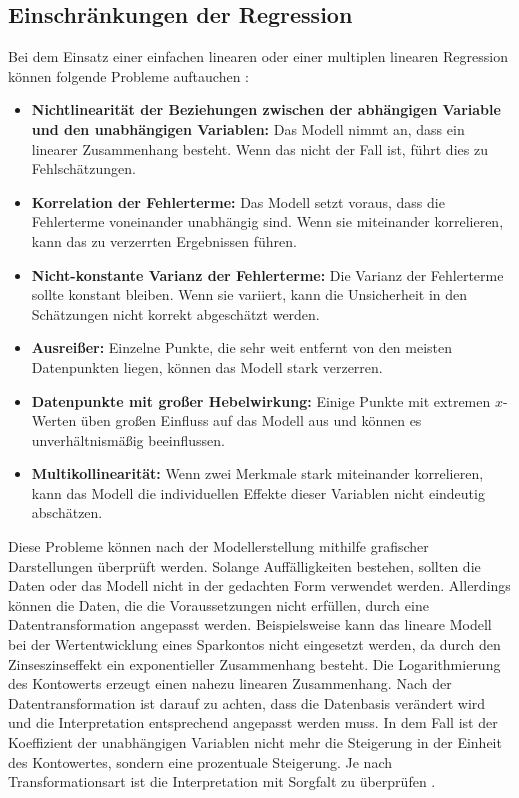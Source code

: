 \subsection{Einschränkungen der Regression}
\label{einschränkungenderregression}
Bei dem Einsatz einer einfachen linearen oder einer multiplen linearen Regression können folgende Probleme auftauchen \cite{james2013introduction}: 
\begin{itemize}
    \item \textbf{Nichtlinearität der Beziehungen zwischen der abhängigen Variable und den unabhängigen Variablen:} Das Modell nimmt an, dass ein linearer Zusammenhang besteht. Wenn das nicht der Fall ist, führt dies zu Fehlschätzungen. 
    \item \textbf{Korrelation der Fehlerterme:} Das Modell setzt voraus, dass die Fehlerterme voneinander unabhängig sind. Wenn sie miteinander korrelieren, kann das zu verzerrten Ergebnissen führen.
    \item \textbf{Nicht-konstante Varianz der Fehlerterme:} Die Varianz der Fehlerterme sollte konstant bleiben. Wenn sie variiert, kann die Unsicherheit in den Schätzungen nicht korrekt abgeschätzt werden.
    \item \textbf{Ausreißer:} Einzelne Punkte, die sehr weit entfernt von den meisten Datenpunkten liegen, können das Modell stark verzerren.
    \item \textbf{Datenpunkte mit großer Hebelwirkung:} Einige Punkte mit extremen \(x\)-Werten üben großen Einfluss auf das Modell aus und können es unverhältnismäßig beeinflussen.
    \item \textbf{Multikollinearität:} Wenn zwei Merkmale stark miteinander korrelieren, kann das Modell die individuellen Effekte dieser Variablen nicht eindeutig abschätzen.
\end{itemize}
Diese Probleme können nach der Modellerstellung mithilfe grafischer Darstellungen überprüft werden. Solange Auffälligkeiten bestehen, sollten die Daten oder das Modell nicht in der gedachten Form verwendet werden. Allerdings können die Daten, die die Voraussetzungen nicht erfüllen, durch eine Datentransformation angepasst werden. Beispielsweise kann das lineare Modell bei der Wertentwicklung eines Sparkontos nicht eingesetzt werden, da durch den Zinseszinseffekt ein exponentieller Zusammenhang besteht. Die Logarithmierung des Kontowerts erzeugt einen nahezu linearen Zusammenhang. Nach der Datentransformation ist darauf zu achten, dass die Datenbasis verändert wird und die Interpretation entsprechend angepasst werden muss. In dem Fall ist der Koeffizient der unabhängigen Variablen nicht mehr die Steigerung in der Einheit des Kontowertes, sondern eine prozentuale Steigerung. Je nach Transformationsart ist die Interpretation mit Sorgfalt zu überprüfen \cite{akinkunmi2018data}. \par
